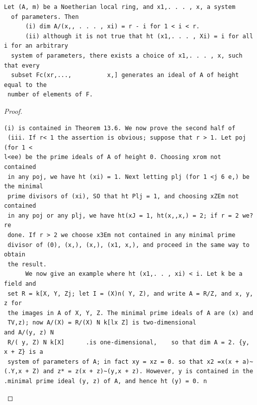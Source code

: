 \begin{theorem}\label{mcrt-auto-theorem-14-1}\uses{}
\begin{verbatim}
Let (A, m) be a Noetherian local ring, and x1,. . . , x, a system
  of parameters. Then
      (i) dim A/(x,, . . . , xi) = r - i for 1 < i < r.
      (ii) although it is not true that ht (x1,. . . , Xi) = i for all i for an arbitrary
  system of parameters, there exists a choice of x1,. . . , x, such that every
  subset Fc(xr,...,          x,] generates an ideal of A of height equal to the
 number of elements of F.
\end{verbatim}
\end{theorem}
\begin{proof}
\begin{verbatim}
(i) is contained in Theorem 13.6. We now prove the second half of
 (iii. If r< 1 the assertion is obvious; suppose that r > 1. Let poj (for 1 <
l<ee) be the prime ideals of A of height 0. Choosing xrom not contained
 in any poj, we have ht (xi) = 1. Next letting plj (for 1 <j 6 e,) be the minimal
 prime divisors of (xi), SO that ht Plj = 1, and choosing xZEm not contained
 in any poj or any plj, we have ht(xJ = 1, ht(x,,x,) = 2; if r = 2 we?re
 done. If r > 2 we choose x3Em not contained in any minimal prime
 divisor of (0), (x,), (x,), (x1, x,), and proceed in the same way to obtain
 the result.
      We now give an example where ht (x1,. . , xi) < i. Let k be a field and
 set R = k[X, Y, Zj; let I = (X)n( Y, Z), and write A = R/Z, and x, y, z for
 the images in A of X, Y, Z. The minimal prime ideals of A are (x) and
 TV,z); now A/(X) = R/(X) N k[lx Z] is two-dimensional                    and A/(y, z) N
 R/( y, Z) N k[X]      .is one-dimensional,    so that dim A = 2. {y, x + Z} is a
 system of parameters of A; in fact xy = xz = 0. so that x2 =x(x + a)~
(.Y,x + Z) and z* = z(x + z)~(y,x + z). However, y is contained in the
.minimal prime ideal (y, z) of A, and hence ht (y) = 0. n
\end{verbatim}
\end{proof}


